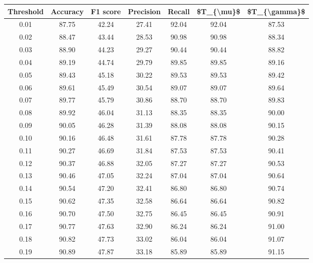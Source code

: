\begin{tabular}{|c|c|c|c|c|c|c|}
\hline
 Threshold &  Accuracy &  F1 score &  Precision &  Recall &  \$T\_\{\textbackslash mu\}\$ &  \$T\_\{\textbackslash gamma\}\$ \\
\hline
      0.01 &     87.75 &     42.24 &      27.41 &   92.04 &      92.04 &         87.53 \\
      0.02 &     88.47 &     43.44 &      28.53 &   90.98 &      90.98 &         88.34 \\
      0.03 &     88.90 &     44.23 &      29.27 &   90.44 &      90.44 &         88.82 \\
      0.04 &     89.19 &     44.74 &      29.79 &   89.85 &      89.85 &         89.16 \\
      0.05 &     89.43 &     45.18 &      30.22 &   89.53 &      89.53 &         89.42 \\
      0.06 &     89.61 &     45.49 &      30.54 &   89.07 &      89.07 &         89.64 \\
      0.07 &     89.77 &     45.79 &      30.86 &   88.70 &      88.70 &         89.83 \\
      0.08 &     89.92 &     46.04 &      31.13 &   88.35 &      88.35 &         90.00 \\
      0.09 &     90.05 &     46.28 &      31.39 &   88.08 &      88.08 &         90.15 \\
      0.10 &     90.16 &     46.48 &      31.61 &   87.78 &      87.78 &         90.28 \\
      0.11 &     90.27 &     46.69 &      31.84 &   87.53 &      87.53 &         90.41 \\
      0.12 &     90.37 &     46.88 &      32.05 &   87.27 &      87.27 &         90.53 \\
      0.13 &     90.46 &     47.05 &      32.24 &   87.04 &      87.04 &         90.64 \\
      0.14 &     90.54 &     47.20 &      32.41 &   86.80 &      86.80 &         90.74 \\
      0.15 &     90.62 &     47.35 &      32.58 &   86.64 &      86.64 &         90.82 \\
      0.16 &     90.70 &     47.50 &      32.75 &   86.45 &      86.45 &         90.91 \\
      0.17 &     90.77 &     47.63 &      32.90 &   86.24 &      86.24 &         91.00 \\
      0.18 &     90.82 &     47.73 &      33.02 &   86.04 &      86.04 &         91.07 \\
      0.19 &     90.89 &     47.87 &      33.18 &   85.89 &      85.89 &         91.15 \\

\end{tabular}
